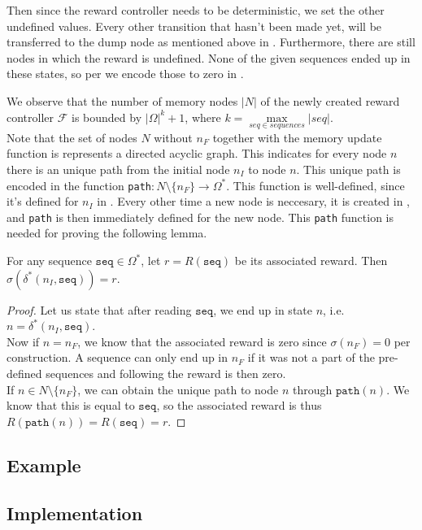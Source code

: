 Then since the reward controller needs to be deterministic, we set the other undefined values. Every other transition that hasn't been made yet, will be transferred to the dump node as mentioned above in . Furthermore, there are still nodes in which the reward is undefined. None of the given sequences ended up in these states, so per  we encode those to zero in .

We observe that the number of memory nodes $|N|$ of the newly created reward controller $\mathcal{F}$ is bounded by $|\Omega|^k + 1$, where $k=\max\limits_{seq\in sequences} |seq|$.\\

Note that the set of nodes $N$ without $n_F$ together with the memory update function is represents a directed acyclic graph. This indicates for every node $n$ there is an unique path from the initial node $n_I$ to node $n$. This unique path is encoded in the function \texttt{path}$:N\setminus\{n_F\}\to\Omega^*$. This function is well-defined, since it's defined for $n_I$ in . Every other time a new node is neccesary, it is created in , and \texttt{path} is then immediately defined for the new node. This \texttt{path} function is needed for proving the following lemma. 


\begin{lemma}
For any sequence $\texttt{seq}\in\Omega^*$, let $r=R(\texttt{seq})$ be its associated reward. Then $\sigma(\delta^*(n_I,\texttt{seq}))=r$.
\begin{proof}
Let us state that after reading $\texttt{seq}$, we end up in state $n$, i.e. $n = \delta^*(n_I,\texttt{seq})$. \\
Now if $n=n_F$, we know that the associated reward is zero since $\sigma(n_F)=0$ per construction. A sequence can only end up in $n_F$ if it was not a part of the pre-defined sequences and following  the reward is then zero. \\
If $n\in N\setminus \{n_F\}$, we can obtain the unique path to node $n$ through $\texttt{path}(n)$. We know that this is equal to $\texttt{seq}$, so the associated reward is thus $R(\texttt{path}(n))=R(\texttt{seq})=r$.
\end{proof}
\label{lem:reward_sequence}
\end{lemma}

\subsection*{Example}


\subsection*{Implementation}
